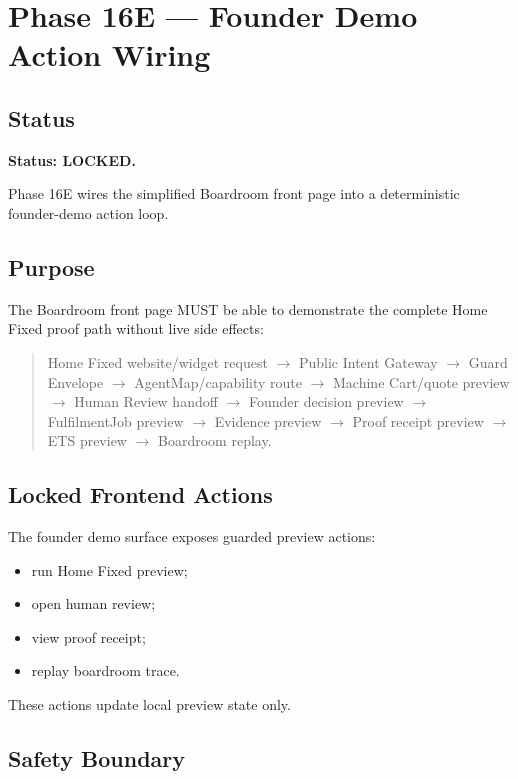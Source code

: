 \section{Phase 16E --- Founder Demo Action Wiring}
\label{sec:aion-phase16e-founder-demo-action-wiring-lock}

\subsection{Status}

\textbf{Status: LOCKED.}

Phase 16E wires the simplified Boardroom front page into a deterministic founder-demo action loop.

\subsection{Purpose}

The Boardroom front page MUST be able to demonstrate the complete Home Fixed proof path without live side effects:

\begin{quote}
Home Fixed website/widget request $\rightarrow$ Public Intent Gateway $\rightarrow$ Guard Envelope $\rightarrow$ AgentMap/capability route $\rightarrow$ Machine Cart/quote preview $\rightarrow$ Human Review handoff $\rightarrow$ Founder decision preview $\rightarrow$ FulfilmentJob preview $\rightarrow$ Evidence preview $\rightarrow$ Proof receipt preview $\rightarrow$ ETS preview $\rightarrow$ Boardroom replay.
\end{quote}

\subsection{Locked Frontend Actions}

The founder demo surface exposes guarded preview actions:

\begin{itemize}
  \item run Home Fixed preview;
  \item open human review;
  \item view proof receipt;
  \item replay boardroom trace.
\end{itemize}

These actions update local preview state only.

\subsection{Safety Boundary}

